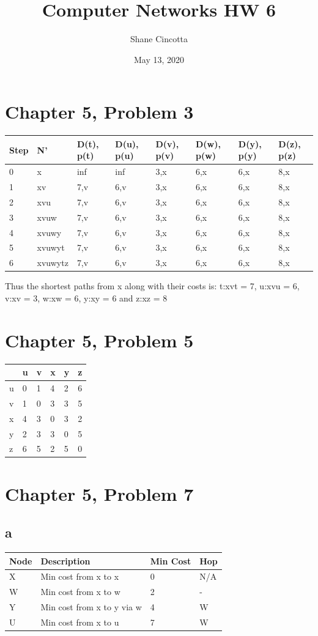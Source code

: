 \documentclass{article}
\title{Computer Networks HW 6}
\author{Shane Cincotta }
\date{May 13, 2020}
\begin{document}
\maketitle

\section*{Chapter 5, Problem 3}
\begin{tabular}{ |l|l|l|l|l|l|l|l|}
  \hline
  Step & N' & D(t), p(t) & D(u), p(u) & D(v), p(v) & D(w), p(w) & D(y), p(y) & D(z), p(z)\\ \hline
  0 & x & inf & inf & 3,x & 6,x & 6,x & 8,x\\ \hline
  1 & xv & 7,v & 6,v & 3,x & 6,x & 6,x & 8,x\\ \hline
  2 & xvu & 7,v & 6,v & 3,x & 6,x & 6,x & 8,x\\ \hline
  3 & xvuw & 7,v & 6,v & 3,x & 6,x & 6,x & 8,x\\ \hline
  4 & xvuwy & 7,v & 6,v & 3,x & 6,x & 6,x & 8,x\\ \hline
  5 & xvuwyt & 7,v & 6,v & 3,x & 6,x & 6,x & 8,x\\ \hline
  6 & xvuwytz & 7,v & 6,v & 3,x & 6,x & 6,x & 8,x\\ \hline
\end{tabular}
\newline Thus the shortest paths from x along with their costs is: t:xvt = 7, u:xvu = 6, v:xv = 3, w:xw = 6, y:xy = 6 and z:xz = 8\\

\section*{Chapter 5, Problem 5}
\begin{tabular}{|l|l|l|l|l|l|}
\hline
& u & v & x & y & z \\ \hline
u & 0 & 1 & 4 & 2 & 6 \\ \hline
v & 1 & 0 & 3 & 3 & 5 \\ \hline
x & 4 & 3 & 0 & 3 & 2 \\ \hline
y & 2 & 3 & 3 & 0 & 5 \\ \hline
z & 6 & 5 & 2 & 5 & 0 \\ \hline
\end{tabular}

\section*{Chapter 5, Problem 7}
\subsection*{a}
\begin{tabular}{|l|l|l|l|}
\hline
Node & Description & Min Cost & Hop \\ \hline
X & Min cost from x to x & 0 & N/A \\ \hline
W & Min cost from x to w & 2 & - \\ \hline
Y & Min cost from x to y via w & 4 & W \\ \hline
U & Min cost from x to u & 7 & W \\ \hline
\end{tabular} 
\end{document}
